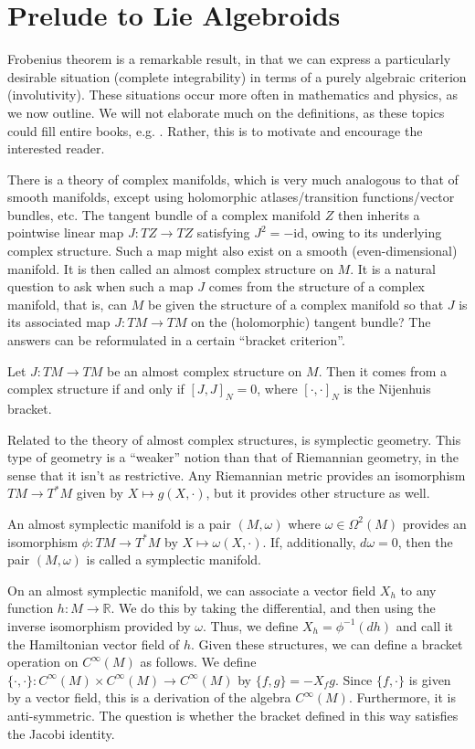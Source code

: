 \section{Prelude to Lie Algebroids}

Frobenius theorem is a remarkable result, in that we can express a particularly desirable situation (complete integrability) in terms of a purely algebraic criterion (involutivity). These situations occur more often in mathematics and physics, as we now outline. We will not elaborate much on the definitions, as these topics could fill entire books, e.g. \cite{Crainic_2021}. Rather, this is to motivate and encourage the interested reader.\par
There is a theory of complex manifolds, which is very much analogous to that of smooth manifolds, except using holomorphic atlases/transition functions/vector bundles, etc. The tangent bundle of a complex manifold $Z$ then inherits a pointwise linear map $J:TZ\to TZ$ satisfying $J^2=-\text{id}$, owing to its underlying complex structure. Such a map might also exist on a smooth (even-dimensional) manifold. It is then called an almost complex structure on $M$. It is a natural question to ask when such a map $J$ comes from the structure of a complex manifold, that is, can $M$ be given the structure of a complex manifold so that $J$ is its associated map $J:TM\to TM$ on the (holomorphic) tangent bundle? The answers can be reformulated in a certain ``bracket criterion''.
\begin{theorem}
  Let $J:TM\to TM$ be an almost complex structure on $M$. Then it comes from a complex structure if and only if $[J,J]_N=0$, where $[\cdot,\cdot]_N$ is the Nijenhuis bracket.
\end{theorem}
Related to the theory of almost complex structures, is symplectic geometry. This type of geometry is a ``weaker'' notion than that of Riemannian geometry, in the sense that it isn't as restrictive. Any Riemannian metric provides an isomorphism $TM\to T^*M$ given by $X\mapsto g(X,\cdot)$, but it provides other structure as well.
\begin{definition}
  An almost symplectic manifold is a pair $(M,\omega)$ where $\omega\in\Omega^2(M)$ provides an isomorphism $\phi:TM\to T^*M$ by $X\mapsto \omega(X,\cdot)$. If, additionally, $d\omega=0$, then the pair $(M,\omega)$ is called a symplectic manifold.
\end{definition}
On an almost symplectic manifold, we can associate a vector field $X_h$ to any function $h:M\to\mathbb{R}$. We do this by taking the differential, and then using the inverse isomorphism provided by $\omega$. Thus, we define $X_h=\phi^{-1}(dh)$ and call it the Hamiltonian vector field of $h$. Given these structures, we can define a bracket operation on $C^\infty(M)$ as follows. We define $\{\cdot,\cdot\}:C^\infty(M)\times C^\infty(M)\to C^\infty(M)$ by $\{f,g\}=-X_fg$. Since $\{f,\cdot\}$ is given by a vector field, this is a derivation of the algebra $C^\infty(M)$. Furthermore, it is anti-symmetric. The question is whether the bracket defined in this way satisfies the Jacobi identity.
